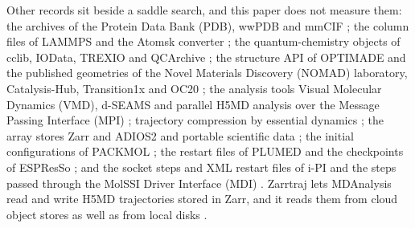\documentclass[preprint,12pt]{elsarticle}
\begin{document}
Other records sit beside a saddle search, and this paper does not measure them: the archives of the Protein Data Bank (PDB), wwPDB and mmCIF \cite{bermanProteinDataBank2000,bermanAnnouncingWorldwideProtein2003,westbrookStarmmcifOntologyMacromolecular2000}; the column files of LAMMPS and the Atomsk converter \cite{thompsonLammpsFlexibleSimulation2022,hirelAtomskToolManipulating2015}; the quantum-chemistry objects of cclib, IOData, TREXIO and QCArchive \cite{oboyleCclibLibraryPackageindependent2008,verstraelenIodataPythonLibrary2021,posenitskiyTrexioFileFormat2023,smithMolssiQcaRchive2021}; the structure API of OPTIMADE and the published geometries of the Novel Materials Discovery (NOMAD) laboratory, Catalysis-Hub, Transition1x and OC20 \cite{andersenOptimadeApiExchanging2021,draxlNomadLaboratoryData2019,wintherCatalysishuborgOpenElectronic2019,schreinerTransition1xDatasetBuilding2022,chanussotOpenCatalyst20202021}; the analysis tools Visual Molecular Dynamics (VMD), d-SEAMS and parallel H5MD analysis over the Message Passing Interface (MPI) \cite{humphreyVmdVisualMolecular1996,goswamiDseamsDeferredStructural2020,jakupovicMpiparallelMolecularDynamics2021}; trajectory compression by essential dynamics \cite{meyerEssentialDynamicsTool2006}; the array stores Zarr and ADIOS2 and portable scientific data \cite{opengeospatialconsortiumZarrStorageSpecification2022,godoyAdios2Adaptable2020,brownSoftwarePortableScientific1993}; the initial configurations of PACKMOL \cite{martinezPackmolPackageBuilding2009}; the restart files of PLUMED and the checkpoints of ESPResSo \cite{tribelloPlumed2New2014,weikEspresso40Extensible2019}; and the socket steps and XML restart files of i-PI and the steps passed through the MolSSI Driver Interface (MDI) \cite{ceriottiIpiPythonInterface2014,kapilIpi20Universal2019,litmanIpi30Flexible2024,barnesMolssiDriverInterface2021}.
Zarrtraj lets MDAnalysis read and write H5MD trajectories stored in Zarr, and it reads them from cloud object stores as well as from local disks \cite{woodsZarrtrajPythonPackage2026}.
\end{document}
